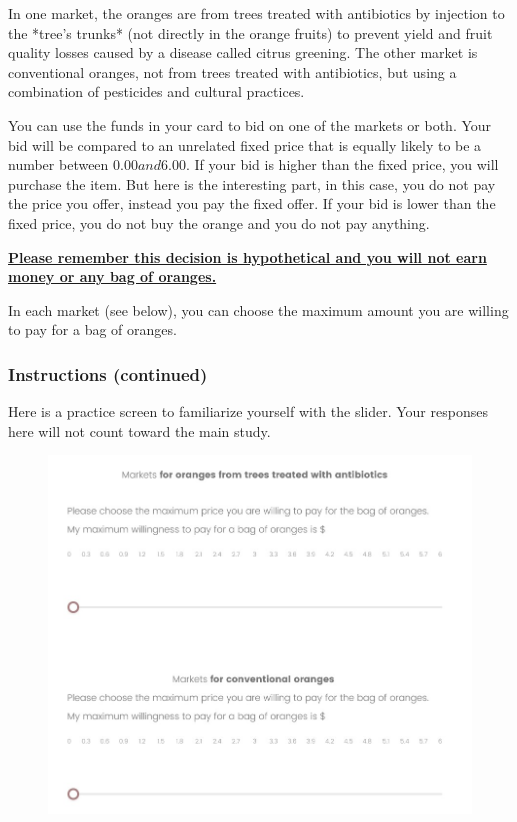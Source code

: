 \documentclass[12pt]{article}
\begin{document}
In one market, the oranges are from trees treated with antibiotics by injection to the *tree’s trunks* (not directly in the orange fruits) to prevent yield and fruit quality losses caused by a disease called citrus greening. The other market is conventional oranges, not from trees treated with antibiotics, but using a combination of pesticides and cultural practices.

You can use the funds in your card to bid on one of the markets or both. Your bid will be compared to an unrelated fixed price that is equally likely to be a number between $0.00 and $6.00. If your bid is higher than the fixed price, you will purchase the item. But here is the interesting part, in this case, you do not pay the price you offer, instead you pay the fixed offer. If your bid is lower than the fixed price, you do not buy the orange and you do not pay anything. 

\vspace{0.5cm}

{\textbf{\uline{Please remember this decision is hypothetical
and you will not earn money  or any bag of oranges.}}}



In each market (see below), you can choose the maximum amount you are willing to pay for a bag of oranges.
\clearpage

\subsubsection{\textbf{Instructions (continued)}}
 Here is a practice screen to familiarize yourself with the slider. Your responses here will not count toward the main study.

\begin{figure}[H]
    \centering
    \includegraphics[width=0.8\linewidth]{BDM_market.jpg}

\end{figure}
\end{document}
